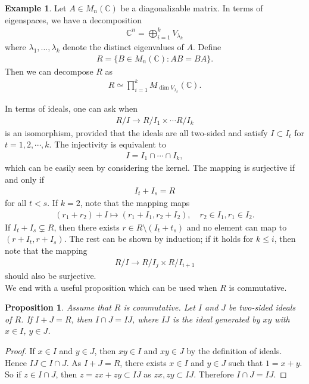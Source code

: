 \documentclass[12pt]{report}
\theoremstyle{plain}
\newtheorem{proposition}[theorem]{Proposition}
\theoremstyle{remark}
\theoremstyle{definition}
\newtheorem{example}[theorem]{Example}
\newcommand{\C}{\mathbb{C}}
\begin{document}
\begin{example}
    Let $A\in M_n(\C)$ be a diagonalizable matrix. In terms of eigenspaces, we have a decomposition
    \begin{align*}
        \C^n = \bigoplus_{i=1}^k V_{\lambda_k}
    \end{align*}
    where $\lambda_1,\dots,\lambda_k$ denote the distinct eigenvalues of $A$. Define
    \begin{align*}
        R = \{B\in M_n(\C):AB=BA\}.
    \end{align*}
    Then we can decompose $R$ as
    \begin{align*}
        R\simeq \prod_{i=1}^k M_{\dim V_{\lambda_k}}(\C).
    \end{align*}
\end{example}

In terms of ideals, one can ask when
\begin{align*}
    R/I\rightarrow R/I_1\times\cdots R/I_k
\end{align*}
is an isomorphism, provided that the ideals are all two-sided and satisfy $I\subset I_t$ for $t=1,2,\cdots,k$. The injectivity is equivalent to
\begin{align*}
    I=I_1\cap \cdots\cap I_k,
\end{align*}
which can be easily seen by considering the kernel. The mapping is surjective if and only if
\begin{align*}
    I_t+I_s = R
\end{align*}
for all $t<s$. If $k=2$, note that the mapping maps
\begin{align*}
    (r_1+r_2) + I\mapsto (r_1 + I_1,r_2 + I_2),\quad r_2\in I_1,r_1\in I_2.
\end{align*}
If $I_t+I_s \subsetneq R$, then there exists $r\in R\setminus (I_t+t_s)$ and no element can map to $(r+I_t,r+I_s)$. The rest can be shown by induction; if it holds for $k\le i$, then note that the mapping
\begin{align*}
    R/I\rightarrow R/I_j\times R/I_{i+1}
\end{align*}
should also be surjective. \\

We end with a useful proposition which can be used when $R$ is commutative.
\begin{proposition}
    Assume that $R$ is commutative. Let $I$ and $J$ be two-sided ideals of $R$. If $I+J=R$, then $I\cap J=IJ$, where $IJ$ is the ideal generated by $xy$ with $x\in I$, $y\in J$.
\end{proposition}
\begin{proof}
    If $x\in I$ and $y\in J$, then $xy\in I$ and $xy\in J$ by the definition of ideals. Hence $IJ\subset I\cap J$. As $I+J=R$, there exists $x\in I$ and $y\in J$ such that $1=x+y$. So if $z\in I\cap J$, then $z=zx+zy\subset IJ$ as $zx,zy\subset IJ$. Therefore $I\cap J=IJ$.
\end{proof}
\end{document}
